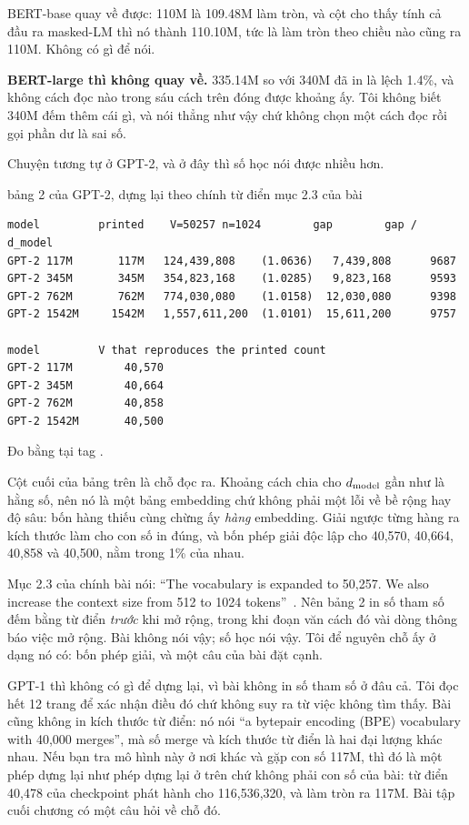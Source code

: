 BERT-base quay về được: 110M là 109.48M làm tròn, và cột  cho thấy
tính cả đầu ra masked-LM thì nó thành 110.10M, tức là làm tròn theo chiều nào
cũng ra 110M. Không có gì để nói.

\textbf{BERT-large thì không quay về.} 335.14M so với 340M đã in là lệch 1.4\%,
và không cách đọc nào trong sáu cách trên đóng được khoảng ấy. Tôi không biết
340M đếm thêm cái gì, và nói thẳng như vậy chứ không chọn một cách đọc rồi gọi
phần dư là sai số.

Chuyện tương tự ở GPT-2, và ở đây thì số học nói được nhiều hơn.

\begin{measured}{bảng 2 của GPT-2, dựng lại theo chính từ điển mục 2.3 của bài}
\begin{verbatim}
model         printed    V=50257 n=1024        gap        gap / d_model
GPT-2 117M       117M   124,439,808    (1.0636)   7,439,808      9687
GPT-2 345M       345M   354,823,168    (1.0285)   9,823,168      9593
GPT-2 762M       762M   774,030,080    (1.0158)  12,030,080      9398
GPT-2 1542M     1542M   1,557,611,200  (1.0101)  15,611,200      9757

model         V that reproduces the printed count
GPT-2 117M        40,570
GPT-2 345M        40,664
GPT-2 762M        40,858
GPT-2 1542M       40,500
\end{verbatim}

Đo bằng  tại tag .
\end{measured}

Cột cuối của bảng trên là chỗ đọc ra. Khoảng cách chia cho \(d_{\mathrm{model}}\) gần như
là hằng số, nên nó là một bảng embedding chứ không phải một lỗi về bề rộng hay
độ sâu: bốn hàng thiếu cùng chừng ấy \emph{hàng} embedding. Giải ngược từng
hàng ra kích thước  làm cho con số in đúng, và bốn phép
giải độc lập cho
40,570, 40,664, 40,858 và 40,500, nằm trong 1\% của nhau.

Mục 2.3 của chính bài nói: \enquote{The vocabulary is expanded to 50,257. We
also increase the context size from 512 to 1024
tokens}~\autocite{radford2019gpt2}. Nên bảng 2 in số tham số đếm bằng từ điển
\emph{trước} khi mở rộng, trong khi đoạn văn cách đó vài dòng thông báo việc mở
rộng. Bài không nói vậy; số học nói vậy. Tôi để nguyên chỗ ấy ở dạng nó có:
bốn phép giải, và một câu của bài đặt cạnh.

GPT-1 thì không có gì để dựng lại, vì bài không in số tham số ở đâu cả. Tôi đọc
hết 12 trang để xác nhận điều đó chứ không suy ra từ việc không tìm thấy. Bài
cũng không in kích thước từ điển: nó nói \enquote{a bytepair encoding (BPE)
vocabulary with 40,000 merges}, mà số merge và kích thước từ điển là hai đại
lượng khác nhau. Nếu bạn tra mô hình này ở nơi khác và gặp con số 117M, thì đó
là một phép dựng lại như phép dựng lại ở trên chứ không phải con số của bài: từ
điển 40,478 của checkpoint phát hành cho 116,536,320, và làm tròn ra 117M. Bài
tập cuối chương có một câu hỏi về chỗ đó.

